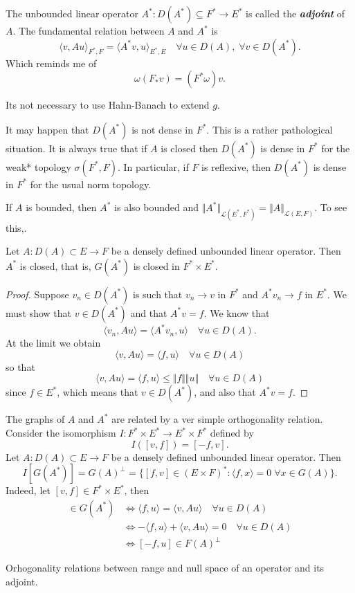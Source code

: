 \documentclass{article}
\theoremstyle{definition}
\numberwithin{equation}{section}
\begin{document}
	The unbounded linear operator $A^*:D(A^*)\subseteq F^*\to E^*$ is called the \textbf{\textit{adjoint}} of $A$. The fundamental relation between $A$ and $A^*$ is
	\[\langle v,Au\rangle_{F^*,F}=\langle A^*v,u\rangle_{E^*,E}\quad\forall u\in D(A),\;\forall v\in D(A^*).\]
	{\color{blue}Which reminds me of
		\[\omega (F_*v)=(F^*\omega)v.\]}
	\begin{remark}
		Its not necessary to use Hahn-Banach to extend $g$.
	\end{remark}
	\begin{remark}
		It may happen that $D(A^*)$ is not dense in $F^*$. This is a rather pathological situation. It is always true that if $A$ is closed then $D(A^*)$ is dense in $F^*$ for the weak* topology $\sigma(F^*,F)$. In particular, if $F$ is reflexive, then $D(A^*)$ is dense in $F^*$ for the usual norm topology.
	\end{remark}
	\begin{remark}
		If $A$ is bounded, then $A^*$ is also bounded and $\Vert A^*\Vert_{\mathcal{L}(E^*,F^*)}=\Vert A\Vert_{\mathcal{L}(E,F)}$. {\color{orange} To see this,}.
	\end{remark}
	\begin{prop}
		Let $A:D(A)\subset E\to F$ be a densely defined unbounded linear operator. Then $A^*$ is closed, that is, $G(A^*)$ is closed in $F^*\times E^*$.
	\end{prop}
	\begin{proof}
		Suppose $v_n\in D(A^*)$ is such that $v_n\to v$ in $F^*$ and $A^*v_n\to f$ in $E^*$. We must show that $v\in D(A^*) $ and that $A^*v=f$. We know that
		\[\langle v_n, Au\rangle=\langle A^*v_n,u\rangle\quad\forall u\in D(A).\]
		At the limit we obtain
		\[\langle v,Au\rangle =\langle f,u\rangle\quad\forall u\in D(A)\]
		so that
		\[\langle v,Au\rangle=\langle f,u\rangle\leq \Vert f\Vert \Vert u\Vert\quad\forall u\in D(A)\]
		since $f\in E^*$, which means that $v\in D(A^*)$, and also that $A^*v=f$.
	\end{proof}
	
	The graphs of $A$ and $A^*$ are related by a ver simple orthogonality relation. Consider the isomorphism $I:F^*\times E^*\to E^*\times F^*$ defined by
	\[I([v,f])=[-f,v].\]
	Let $A:D(A)\subset E\to F$ be a densely defined unbounded linear operator. Then
	\[I[G(A^*)]=G(A)^\perp=\{[f,v]\in (E\times F)^*:\langle f,x\rangle=0\;\forall x\in G(A)\}.\]
	Indeed, let $[v,f]\in F^*\times E^*$, then
	\begin{align*}
		[v,f]\in G(A^*)&\iff \langle f,u\rangle=\langle v,Au\rangle\quad\forall u\in D(A)\\
		&\iff -\langle f,u\rangle+\langle v,Au\rangle=0\quad\forall u\in D(A)\\
		&\iff [-f,u]\in F(A)^\perp
	\end{align*}
	\begin{coro}
		{\color{orange} Orhogonality relations between range and null space of an operator and its adjoint.}
	\end{coro}
	
\end{document}
